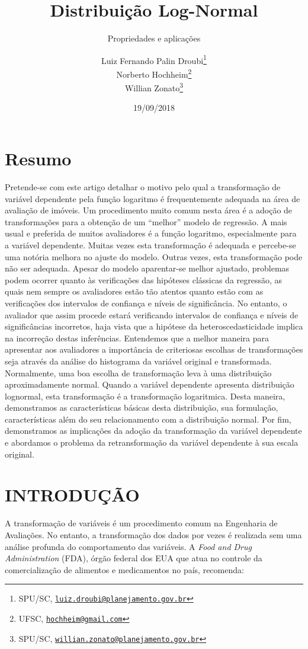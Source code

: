 \documentclass[a4paper]{article}
\title{Distribuição Log-Normal}
\subtitle{Propriedades e aplicações}
\author{Luiz Fernando Palin Droubi\footnote{SPU/SC,
  \href{mailto:luiz.droubi@planejamento.gov.br}{\nolinkurl{luiz.droubi@planejamento.gov.br}}} \\ Norberto Hochheim\footnote{UFSC,
  \href{mailto:hochheim@gmail.com}{\nolinkurl{hochheim@gmail.com}}} \\ Willian Zonato\footnote{SPU/SC,
  \href{mailto:willian.zonato@planejamento.gov.br}{\nolinkurl{willian.zonato@planejamento.gov.br}}}}
\date{19/09/2018}
\begin{document}
\maketitle

\section*{Resumo}\label{resumo}

Pretende-se com este artigo detalhar o motivo pelo qual a transformação
de variável dependente pela função logaritmo é frequentemente adequada
na área de avaliação de imóveis. Um procedimento muito comum nesta área
é a adoção de transformações para a obtenção de um ``melhor'' modelo de
regressão. A mais usual e preferida de muitos avaliadores é a função
logaritmo, especialmente para a variável dependente. Muitas vezes esta
transformação é adequada e percebe-se uma notória melhora no ajuste do
modelo. Outras vezes, esta transformação pode não ser adequada. Apesar
do modelo aparentar-se melhor ajustado, problemas podem ocorrer quanto
às verificações das hipóteses clássicas da regressão, as quais nem
sempre os avaliadores estão tão atentos quanto estão com as verificações
dos intervalos de confiança e níveis de significância. No entanto, o
avaliador que assim procede estará verificando intervalos de confiança e
níveis de significâncias incorretos, haja vista que a hipótese da
heteroscedasticidade implica na incorreção destas inferências.
Entendemos que a melhor maneira para apresentar aos avaliadores a
importância de criteriosas escolhas de transformações seja através da
análise do histograma da variável original e transformada. Normalmente,
uma boa escolha de transformação leva à uma distribuição aproximadamente
normal. Quando a variável dependente apresenta distribuição lognormal,
esta transformação é a transformação logaritmica. Desta maneira,
demonstramos as características básicas desta distribuição, sua
formulação, características além do seu relacionamento com a
distribuição normal. Por fim, demonstramos as implicações da adoção da
transformação da variável dependente e abordamos o problema da
retransformação da variável dependente à sua escala original.

\section{INTRODUÇÃO}\label{introducao}

A transformação de variáveis é um procedimento comum na Engenharia de
Avaliações. No entanto, a transformação dos dados por vezes é realizada
sem uma análise profunda do comportamento das variáveis. A \emph{Food
and Drug Administration} (FDA), órgão federal dos EUA que atua no
controle da comercialização de alimentos e medicamentos no país,
recomenda:
\end{document}
